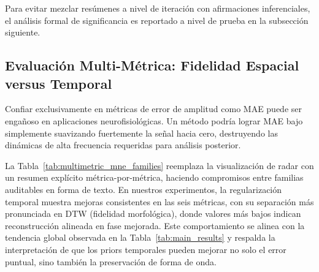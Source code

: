 Para evitar mezclar resúmenes a nivel de iteración con afirmaciones inferenciales, el análisis formal de significancia es reportado a nivel de prueba en la subsección siguiente.

\subsection{Evaluación Multi-Métrica: Fidelidad Espacial versus Temporal}

Confiar exclusivamente en métricas de error de amplitud como MAE puede ser engañoso en aplicaciones neurofisiológicas. Un método podría lograr MAE bajo simplemente suavizando fuertemente la señal hacia cero, destruyendo las dinámicas de alta frecuencia requeridas para análisis posterior.

\begin{table}[ht]
\centering
\caption{Comparación multi-métrica mediana por familia de método en MNE Sample (agregado sobre escenarios de registro exhaustivo). Menor es mejor para MAE, RMSE, DTW, y LSD; mayor es mejor para SNR y Coherencia.}
\label{tab:multimetric_mne_families}
\end{table}

La Tabla~\ref{tab:multimetric_mne_families} reemplaza la visualización de radar con un resumen explícito métrica-por-métrica, haciendo compromisos entre familias auditables en forma de texto. En nuestros experimentos, la regularización temporal muestra mejoras consistentes en las seis métricas, con su separación más pronunciada en DTW (fidelidad morfológica), donde valores más bajos indican reconstrucción alineada en fase mejorada. Este comportamiento se alinea con la tendencia global observada en la Tabla~\ref{tab:main_results} y respalda la interpretación de que los priors temporales pueden mejorar no solo el error puntual, sino también la preservación de forma de onda.

